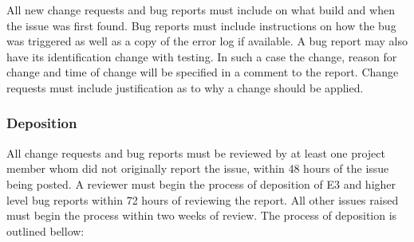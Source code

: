 \documentclass[10pt,letterpaper]{article}
\begin{document}
All new change requests and bug reports must include on what build and when the issue was first found. Bug reports must include instructions on how the bug was triggered as well as a copy of the error log if available. A bug report may also have its identification change with testing. In such a case the change, reason for change and time of change will be specified in a comment to the report. Change requests must include justification as to why a change should be applied.

\subsubsection{Deposition}
All change requests and bug reports must be reviewed by at least one project member whom did not originally report the issue, within 48 hours of the issue being posted. A reviewer must begin the process of deposition of E3 and higher level bug reports within 72 hours of reviewing the report. All other issues raised must begin the process within two weeks of review. The process of deposition is outlined bellow:
\end{document}
